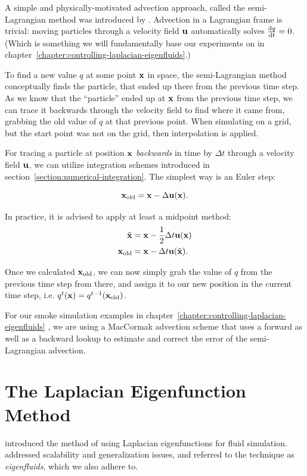 A simple and physically-motivated advection approach, called the semi-Lagrangian
method was introduced by \citet{StableFluids}.  Advection in a Lagrangian frame
is trivial: moving particles through a velocity field $\vb{u}$ automatically
solves $\dv{q}{t} = 0$. (Which is something we will fundamentally base our
experiments on in chapter~\ref{chapter:controlling-laplacian-eigenfluids}.) 

To find a new value $q$ at some point $\vb{x}$ in space, the semi-Lagrangian
method conceptually finds the particle, that ended up there from the previous
time step. As we know that the ``particle'' ended up at $\vb{x}$ from the previous
time step, we can trace it backwards through the velocity field to find where it
came from, grabbing the old value of $q$ at that previous point. When simulating
on a grid, but the start point was not on the grid, then interpolation is
applied.

For tracing a particle at position $\vb{x}$ \textit{backwards} in time by
$\Delta t$ through a velocity field $\vb{u}$, we can utilize integration schemes
introduced in section~\ref{section:numerical-integration}.  The simplest way is
an Euler step: 

$$\vb{x}_{\text{old}} = \vb{x} - \Delta \vb{u}(\vb{x}).$$

In practice, it is advised to apply at least a midpoint method: 
\begin{align*}
    \tilde{\vb{x}} &= \vb{x} - \frac{1}{2}\Delta t \vb{u}(\vb{x})\\
    \vb{x}_{\text{old}} &= \vb{x} - \Delta t \vb{u}(\tilde{\vb{x}}).
\end{align*}

Once we calculated $\vb{x}_{\text{old}}$, we can now simply grab the value of
$q$ from the previous time step from there, and assign it to our new position in
the current time step, i.e. $q^{t}(\vb{x}) = q^{t-1}(\vb{x}_{\text{old}})$.

For our smoke simulation examples in
chapter~\ref{chapter:controlling-laplacian-eigenfluids} , we are using
a MacCormak advection scheme \cite{maccormack} that uses a forward as well as
a backward lookup to estimate and correct the error of the semi-Lagrangian
advection.

\section{The Laplacian Eigenfunction Method}
\label{section:laplacian-eigenfluids}
\citet{dewitt} introduced the method of using Laplacian eigenfunctions for fluid
simulation. \citet{scalable-eigenfluids} addressed scalability and generalization
issues, and referred to the technique as \textit{eigenfluids}, which we also
adhere to.


